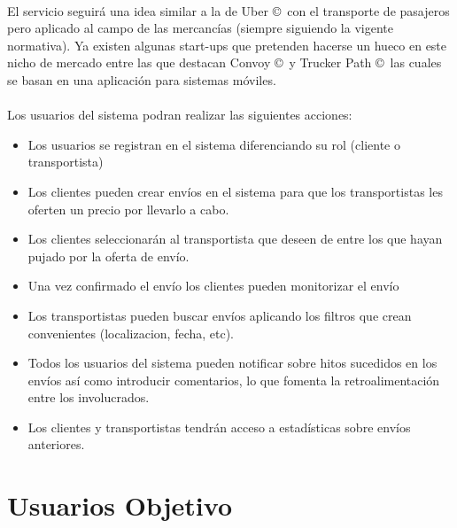 \documentclass[10pt, a4paper,spanish]{article}
\begin{document}
		\paragraph{}
		El servicio seguirá una idea similar a la de Uber \copyright\  con el transporte de pasajeros pero aplicado al campo de las mercancías (siempre siguiendo la vigente normativa). Ya existen algunas start-ups que pretenden hacerse un hueco en este nicho de mercado entre las que destacan Convoy \copyright\ y Trucker Path \copyright\ las cuales se basan en una aplicación para sistemas móviles. \cite{expansion_uber_transporte}

		\paragraph{}
		Los usuarios del sistema podran realizar las siguientes acciones:

		\begin{itemize}

			\item Los usuarios se registran en el sistema diferenciando su rol (cliente o transportista)

			\item Los clientes pueden crear envíos en el sistema para que los transportistas les oferten un precio por llevarlo a cabo.

			\item Los clientes seleccionarán al transportista que deseen de entre los que hayan pujado por la oferta de envío.

			\item Una vez confirmado el envío los clientes pueden monitorizar el envío

			\item Los transportistas pueden buscar envíos aplicando los filtros que crean convenientes (localizacion, fecha, etc).

			\item Todos los usuarios del sistema pueden notificar sobre hitos sucedidos en los envíos así como introducir comentarios, lo que fomenta la retroalimentación entre los involucrados.

			\item Los clientes y transportistas tendrán acceso a estadísticas sobre envíos anteriores.


		\end{itemize}



	\section{Usuarios Objetivo}
\end{document}
